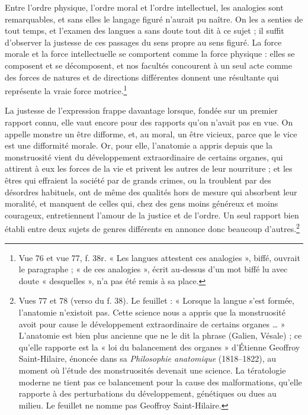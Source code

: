 \documentclass[11pt,a4paper]{article}
\begin{document}
Entre l'ordre physique, l'ordre moral et l'ordre intellectuel, les analogies
sont remarquables, et sans elles le langage figuré n'aurait pu naître. On les a
senties de tout temps, et l'examen des langues a sans doute tout dit à ce sujet ;
il suffit d'observer la justesse de ces passages du sens propre au sens figuré.
La force morale et la force intellectuelle se comportent comme la force
physique : elles se composent et se décomposent, et nos facultés concourent à un
seul acte comme des forces de natures et de directions différentes donnent une
résultante qui représente la vraie force motrice.\footnote{Vue 76 et vue 77,
f. 38r. « Les langues attestent ces analogies », biffé, ouvrait le paragraphe ;
« de ces analogies », écrit au-dessus d'un mot biffé lu avec doute
« desquelles », n'a pas été remis à sa place.}

La justesse de l'expression frappe davantage lorsque, fondée sur un premier
rapport connu, elle vaut encore pour des rapports qu'on n'avait pas en vue. On
appelle monstre un être difforme, et, au moral, un être vicieux, parce que le
vice est une difformité morale. Or, pour elle, l'anatomie a appris depuis que la
monstruosité vient du développement extraordinaire de certains organes, qui
attirent à eux les forces de la vie et privent les autres de leur nourriture ; et
les êtres qui effraient la société par de grands crimes, ou la troublent par des
désordres habituels, ont de même des qualités hors de mesure qui absorbent leur
moralité, et manquent de celles qui, chez des gens moins généreux et moins
courageux, entretiennent l'amour de la justice et de l'ordre. Un seul rapport
bien établi entre deux sujets de genres différents en annonce donc beaucoup
d'autres.\footnote{Vues 77 et 78 (verso du f. 38). Le feuillet : « Lorsque la
langue s'est formée, l'anatomie n'existoit pas. Cette science nous a appris que
la monstruosité avoit pour cause le développement extraordinaire de certains
organes \ldots{} » L'anatomie est bien plus ancienne que ne le dit la phrase
(Galien, Vésale) ; ce qu'elle rapporte est la « loi du balancement des organes »
d'Étienne Geoffroy Saint-Hilaire, énoncée dans sa \emph{Philosophie
anatomique} (1818--1822), au moment où l'étude des monstruosités devenait une
science. La tératologie moderne ne tient pas ce balancement pour la cause des
malformations, qu'elle rapporte à des perturbations du développement,
génétiques ou dues au milieu. Le feuillet ne nomme pas Geoffroy
Saint-Hilaire.}
\end{document}

